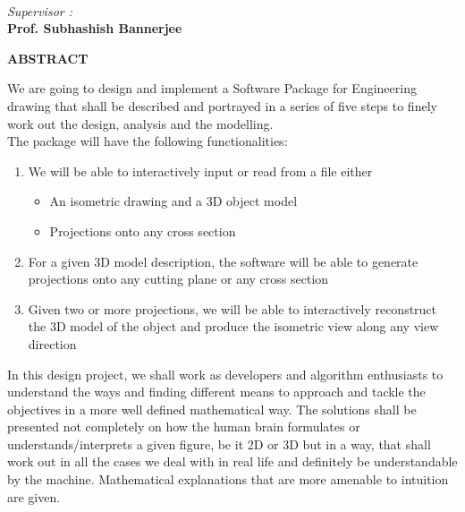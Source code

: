 \documentclass[12pt]{report}
\begin{document}
\begin{center}
\begin{multicols*}{2}
\begin{flushleft}
\end{flushleft}


\columnbreak

\begin{flushleft}

\textit{\\Supervisor :\\ }
\textbf{Prof. Subhashish Bannerjee} \\[5pt]

\end{flushleft}

\end{multicols*}

\end{center}

\newpage



\begin{center}
\Large \bf ABSTRACT
\end{center}
\vspace{0.2in}

We are going to design and implement a Software Package for Engineering drawing that shall be described and portrayed in a series of five steps to finely work out the design, analysis and the modelling.
\\
\vspace{0.3cm}
The package will have the following functionalities:

\begin{enumerate}
  \item
  We will be able to interactively input or read from a file either
  \begin{itemize}
    \item
    An isometric drawing and a 3D object model 
    \item
    Projections onto any cross section
  \end{itemize}
  \item
  For a given 3D model description, the software will be able to generate projections onto any cutting plane or any cross section
  \item
  Given two or more projections, we will be able to interactively reconstruct the 3D model of the object and produce the isometric view along any view direction

\end{enumerate}

\vspace{0.5cm}
In this design project, we shall work as developers and algorithm enthusiasts to understand the ways and finding different means to approach and tackle the objectives in a more well defined mathematical way. The solutions shall be presented not completely on how the human brain formulates or understands/interprets a given figure, be it 2D or 3D but in a way, that shall work out in all the cases we deal with in real life and definitely be understandable by the machine. Mathematical explanations that are more amenable to intuition are given.
\end{document}
